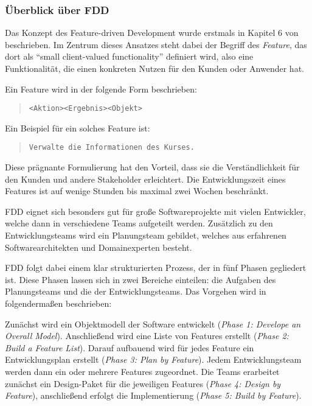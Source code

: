 \documentclass[acmtog]{acmart}
\begin{document}
\subsubsection{Überblick über FDD}
Das Konzept des Feature-driven Development wurde erstmals in Kapitel 6 von \cite{coad99} beschrieben. 
Im Zentrum dieses Ansatzes steht dabei der Begriff des \emph{Feature}, das dort als ``small client-valued functionality'' definiert wird, also eine Funktionalität, die einen konkreten Nutzen für den Kunden oder Anwender hat.

Ein Feature wird in der folgende Form beschrieben:

\begin{quote}
\texttt{<Aktion>\hspace{5ex}<Ergebnis>\hspace{5ex}<Objekt>}
\end{quote}

Ein Beispiel für ein solches Feature ist:

\begin{quote}
\texttt{Verwalte die Informationen des Kurses.}
\end{quote}

Diese prägnante Formulierung hat den Vorteil, dass sie die Verständlichkeit für den Kunden und andere Stakeholder erleichtert.
Die Entwicklungszeit eines Features ist auf wenige Stunden bis maximal zwei Wochen beschränkt.

FDD eignet sich besonders gut für große Softwareprojekte mit vielen Entwickler, welche dann in verschiedene Teams aufgeteilt werden.
Zusätzlich zu den Entwicklungsteams wird ein Planungsteam gebildet, welches aus erfahrenen Softwarearchitekten und Domainexperten besteht.

FDD folgt dabei einem klar strukturierten Prozess, der in fünf Phasen gegliedert ist. Diese Phasen lassen sich in zwei Bereiche einteilen: die Aufgaben des Planungsteams und die der Entwicklungsteams. Das Vorgehen wird in \cite{coad99} folgendermaßen beschrieben:

Zunächst wird ein Objektmodell der Software entwickelt (\emph{Phase 1: Develope an Overall Model}).
Anschließend wird eine Liste von Features erstellt (\emph{Phase 2: Build a Feature List}).
Darauf aufbauend wird für jedes Feature ein Entwicklungsplan erstellt (\emph{Phase 3: Plan by Feature}).
Jedem Entwicklungsteam werden dann ein oder mehrere Features zugeordnet.
Die Teams erarbeitet zunächst ein Design-Paket für die jeweiligen Features (\emph{Phase 4: Design by Feature}),
anschließend erfolgt die Implementierung (\emph{Phase 5: Build by Feature}).
\end{document}
